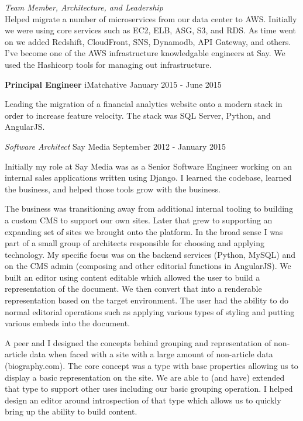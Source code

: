 \documentclass[margin]{res}
\begin{document}
\begin{resume}
                \emph{Team Member, Architecture, and Leadership}\\
                Helped migrate a number of microservices from our data center to
                AWS.  Initially we were using core services such as EC2, ELB, ASG, S3,
                and RDS.  As time went on we added Redshift, CloudFront, SNS, Dynamodb,
                API Gateway, and others.  I've become one of the AWS infrastructure
                knowledgable engineers at Say.  We used the Hashicorp tools for managing
                out infrastructure.

                \textbf{Principal Engineer} iMatchative \hfill January 2015 - June 2015

                Leading the migration of a financial analytics website onto a modern stack
                in order to increase feature velocity.  The stack was SQL Server,
                Python, and AngularJS.
 
                {\sl\large Software Architect} Say Media \hfill September 2012 - January 2015

                Initially my role at Say Media was as a Senior Software Engineer working
                on an internal sales applications written using Django. I learned the
                codebase, learned the business, and helped those tools grow with the
                business.

                The business was transitioning away from additional internal tooling
                to building a custom CMS to support our own sites. Later that grew to
                supporting an expanding set of sites we brought onto the platform. In
                the broad sense I was part of a small group of architects responsible
                for choosing and applying technology. My specific focus was on the
                backend services (Python, MySQL) and on the CMS admin (composing and
                other editorial functions in AngularJS). We built an editor using
                content editable which allowed the user to build a representation of
                the document. We then convert that into a renderable representation
                based on the target environment. The user had the ability to do normal
                editorial operations such as applying various types of styling and
                putting various embeds into the document.

                A peer and I designed the concepts behind grouping and representation of
                non-article data when faced with a site with a large amount of non-article
                data (biography.com). The core concept was a type with base properties
                allowing us to display a basic representation on the site. We are able to
                (and have) extended that type to support other uses including our basic
                grouping operation. I helped design an editor around introspection of that
                type which allows us to quickly bring up the ability to build content.


\end{resume}
\end{document}
